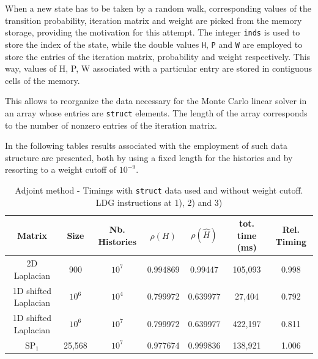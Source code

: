 \documentclass[a4paper,10pt]{article}
\begin{document}
When a new state 
has to be taken by a random walk, corresponding values of the 
transition probability, iteration matrix and weight are picked from the memory 
storage, providing the motivation for this attempt. The integer \texttt{inds} 
is used to store the index of the state, 
while the double values \texttt{H}, \texttt{P} and \texttt{W} are employed to 
store the entries of the iteration matrix, probability and weight respectively. 
This way, values of H, P, W associated with a particular entry are stored in 
contiguous cells of the memory.


This allows to reorganize the data necessary for the Monte Carlo linear solver 
in an array whose entries are \texttt{struct} elements. The length of the array 
corresponds to the number of nonzero entries of the iteration matrix.

In the following tables results associated with the employment of such data 
structure are presented, both by using a fixed length for the histories and by 
resorting to a weight cutoff of $10^{-9}$.


\begin{table}[!h]
\hspace*{-1cm}
\begin{tabular}{|c|c|c|c|c|c|c|}
\hline
\textbf{Matrix} & \textbf{Size} &\textbf{Nb. Histories} & $\rho(H)$ 
& $\rho(\hat{H})$ & tot. time (ms) & Rel. Timing\\
\hline
2D Laplacian& 900 & $10^7$ & 0.994869 & 0.99447 & 105,093 & 0.998\\
\hline 
1D shifted Laplacian& $10^6$ & $10^4$ & 0.799972 & 0.639977 & 27,404 & 0.792\\
\hline
1D shifted Laplacian& $10^6$ & $10^7$ & 0.799972 & 0.639977 & 422,197 & 0.811\\
\hline
$\text{SP}_1$ & 25,568 & $10^7$ & 0.977674 & 0.999836 & 138,921& 1.006\\
\hline
\end{tabular}
\caption{Adjoint method - Timings with \texttt{struct} data used and without 
weight cutoff. LDG 
instructions at 1), 2) and 
3)}
\label{tab20}
\end{table}
\end{document}
